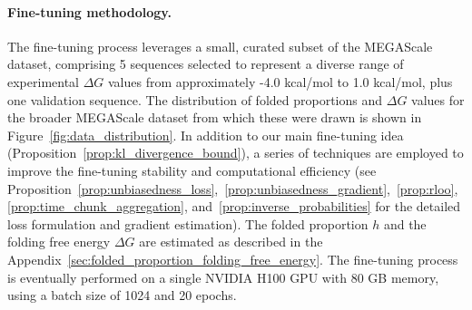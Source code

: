 \documentclass{article}
\theoremstyle{plain}
\theoremstyle{definition}
\theoremstyle{remark}
\begin{document}
\paragraph{Fine-tuning methodology.}
The fine-tuning process leverages a small, curated subset of the MEGAScale dataset, comprising 5 sequences selected to represent a diverse range of experimental $\Delta G$ values from approximately -4.0 kcal/mol to 1.0 kcal/mol, plus one validation sequence. The distribution of folded proportions and $\Delta G$ values for the broader MEGAScale dataset from which these were drawn is shown in Figure~\ref{fig:data_distribution}. In addition to our main fine-tuning idea (Proposition~\ref{prop:kl_divergence_bound}), a series of techniques are employed to improve the fine-tuning stability and computational efficiency (see Proposition~\ref{prop:unbiasedness_loss},~\ref{prop:unbiasedness_gradient},~\ref{prop:rloo},~\ref{prop:time_chunk_aggregation}, and~\ref{prop:inverse_probabilities} for the detailed loss formulation and gradient estimation). The folded proportion $h$ and the folding free energy $\Delta G$ are estimated as described in the Appendix~\ref{sec:folded_proportion_folding_free_energy}. The fine-tuning process is eventually performed on a single NVIDIA H100 GPU with 80 GB memory, using a batch size of 1024 and 20 epochs.
\end{document}
